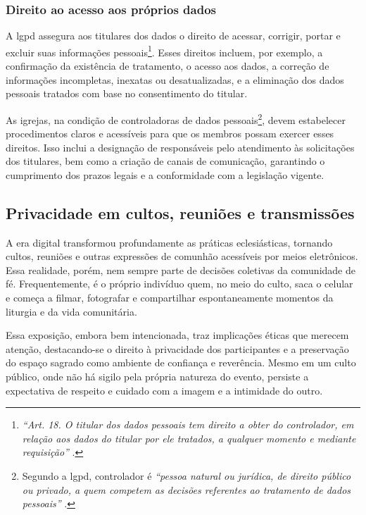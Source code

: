 \subsubsection{Direito ao acesso aos próprios dados}

A \gls{lgpd} assegura aos titulares dos dados o direito de acessar, corrigir, portar e excluir suas informações pessoais\footnote{\textit{``Art. 18. O titular dos dados pessoais tem direito a obter do controlador, em relação aos dados do titular por ele tratados, a qualquer momento e mediante requisição''} \cite[cap.~III, art.~18]{lgpd2018}.}. Esses direitos incluem, por exemplo, a confirmação da existência de tratamento, o acesso aos dados, a correção de informações incompletas, inexatas ou desatualizadas, e a eliminação dos dados pessoais tratados com base no consentimento do titular.

As igrejas, na condição de controladoras de dados pessoais\footnote{Segundo a \gls{lgpd}, controlador é \textit{``pessoa natural ou jurídica, de direito público ou privado, a quem competem as decisões referentes ao tratamento de dados pessoais''} \cite[art.~5º, inciso~VI]{lgpd2018}.}, devem estabelecer procedimentos claros e acessíveis para que os membros possam exercer esses direitos. Isso inclui a designação de responsáveis pelo atendimento às solicitações dos titulares, bem como a criação de canais de comunicação, garantindo o cumprimento dos prazos legais e a conformidade com a legislação vigente.

\subsection{Privacidade em cultos, reuniões e transmissões}

A era digital transformou profundamente as práticas eclesiásticas, tornando cultos, reuniões e outras expressões de comunhão acessíveis por meios eletrônicos. Essa realidade, porém, nem sempre parte de decisões coletivas da comunidade de fé. Frequentemente, é o próprio indivíduo quem, no meio do culto, saca o celular e começa a filmar, fotografar e compartilhar espontaneamente momentos da liturgia e da vida comunitária.

Essa exposição, embora bem intencionada, traz implicações éticas que merecem atenção, destacando-se o direito à privacidade dos participantes e a preservação do espaço sagrado como ambiente de confiança e reverência. Mesmo em um culto público, onde não há sigilo pela própria natureza do evento, persiste a expectativa de respeito e cuidado com a imagem e a intimidade do outro.


